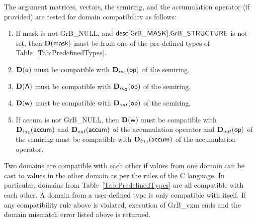 The argument matrices, vectors, the semiring, and the accumulation operator (if provided) 
are tested for domain compatibility as follows:
\begin{enumerate}
	\item If {\sf mask} is not {\sf GrB\_NULL}, and ${\sf desc[GrB\_MASK].GrB\_STRUCTURE}$
    is not set, then $\bold{D}({\sf mask})$ must be from one of the pre-defined types of 
    Table~\ref{Tab:PredefinedTypes}.

	\item $\bold{D}({\sf u})$ must be compatible with $\mbox{$\mathbf{D}_{in_{1}}$}({\sf op})$ of the semiring.

	\item $\bold{D}({\sf A})$ must be compatible with $\mbox{$\mathbf{D}_{in_{2}}$}({\sf op})$ of the semiring.

	\item $\bold{D}({\sf w})$ must be compatible with $\mbox{$\mathbf{D}_{out}$}({\sf op})$ of the semiring.

	\item If {\sf accum} is not {\sf GrB\_NULL}, then $\bold{D}({\sf w})$ must be compatible with $\mbox{$\mathbf{D}_{in_{1}}$}({\sf accum})$ and $\mbox{$\mathbf{D}_{out}$}({\sf accum})$ of the 
	accumulation operator and $\mbox{$\mathbf{D}_{out}$}({\sf op})$ of the semiring must be compatible with $\mbox{$\mathbf{D}_{in_{2}}$}({\sf accum})$ of the accumulation operator.
\end{enumerate}
Two domains are compatible with each other if values from one domain can be cast 
to values in the other domain as per the rules of the C language.
In particular, domains from Table~\ref{Tab:PredefinedTypes} are all compatible 
with each other. A domain from a user-defined type is only compatible with itself.
If any compatibility rule above is violated, execution of {\sf GrB\_vxm} ends and 
the domain mismatch error listed above is returned.

